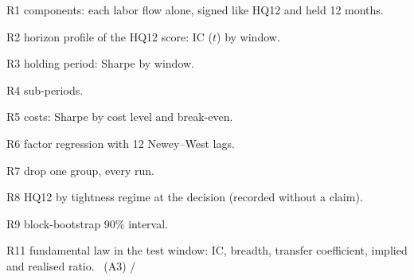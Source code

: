 \begin{table}[H]\centering\footnotesize\caption{R1 components: each labor flow alone, signed like HQ12 and held 12 months. \hfill\tagp}\setlength{\tabcolsep}{4pt}\fit{}\end{table}
\begin{table}[H]\centering\footnotesize\caption{R2 horizon profile of the HQ12 score: IC ($t$) by window. \hfill\tagp}\setlength{\tabcolsep}{4pt}\fit{}\end{table}
\begin{table}[H]\centering\footnotesize\caption{R3 holding period: Sharpe by window. \hfill\tagp}\setlength{\tabcolsep}{4pt}\fit{}\end{table}
\begin{table}[H]\centering\footnotesize\caption{R4 sub-periods. \hfill\tagp}\setlength{\tabcolsep}{4pt}\fit{}\end{table}
\begin{table}[H]\centering\footnotesize\caption{R5 costs: Sharpe by cost level and break-even. \hfill\tagp}\setlength{\tabcolsep}{4pt}\fit{}\end{table}
\begin{table}[H]\centering\footnotesize\caption{R6 factor regression with 12 Newey--West lags. \hfill\tagp}\setlength{\tabcolsep}{4pt}\fit{}\end{table}
\begin{table}[H]\centering\footnotesize\caption{R7 drop one group, every run. \hfill\tagp}\setlength{\tabcolsep}{4pt}\fit{}\end{table}
\begin{table}[H]\centering\scriptsize\caption{R8 HQ12 by tightness regime at the decision (recorded without a claim). \hfill\tagp}\setlength{\tabcolsep}{4pt}\fit{}\end{table}
\begin{table}[H]\centering\footnotesize\caption{R9 block-bootstrap 90\% interval. \hfill\tagp}\setlength{\tabcolsep}{4pt}\fit{}\end{table}
\begin{table}[H]\centering\footnotesize\caption{R11 fundamental law in the test window: IC, breadth, transfer coefficient, implied and realised ratio. \hfill\tagc\ (A3) / \tagp}\setlength{\tabcolsep}{4pt}\fit{}\end{table}
